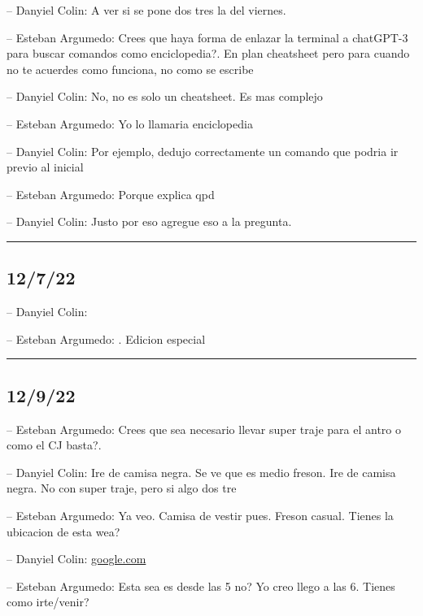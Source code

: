 -- Danyiel Colin: A ver si se pone dos tres la del viernes.

-- Esteban Argumedo: Crees que haya forma de enlazar la terminal a
chatGPT-3 para buscar comandos como enciclopedia?. En plan cheatsheet
pero para cuando no te acuerdes como funciona, no como se escribe

-- Danyiel Colin: No, no es solo un cheatsheet. Es mas complejo

-- Esteban Argumedo: Yo lo llamaria enciclopedia

-- Danyiel Colin: Por ejemplo, dedujo correctamente un comando que
podria ir previo al inicial

-- Esteban Argumedo: Porque explica qpd

-- Danyiel Colin: Justo por eso agregue eso a la pregunta.

\begin{center}\rule{0.5\linewidth}{0.5pt}\end{center}

\hypertarget{section-170}{%
\subsection{12/7/22}\label{section-170}}

-- Danyiel Colin:

-- Esteban Argumedo: . Edicion especial

\begin{center}\rule{0.5\linewidth}{0.5pt}\end{center}

\hypertarget{section-171}{%
\subsection{12/9/22}\label{section-171}}

-- Esteban Argumedo: Crees que sea necesario llevar super traje para el
antro o como el CJ basta?.

-- Danyiel Colin: Ire de camisa negra. Se ve que es medio freson. Ire de
camisa negra. No con super traje, pero si algo dos tre

-- Esteban Argumedo: Ya veo. Camisa de vestir pues. Freson casual.
Tienes la ubicacion de esta wea?

-- Danyiel Colin:
\href{https://www.google.com/maps/place/Will+Club/@25.6738715,-100.3579603,16.46z/data=!4m5!3m4!1s0x0:0x53db2cbe31ca9ed8!8m2!3d25.6737564!4d-100.3564147}{google.com}

-- Esteban Argumedo: Esta sea es desde las 5 no? Yo creo llego a las 6.
Tienes como irte/venir?

